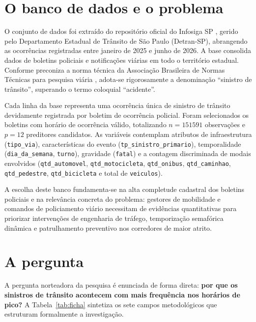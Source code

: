 \documentclass[
  article,
  12pt,
  oneside,
  a4paper,
  english,
  brazil
]{abntex2}\usepackage[]{graphicx}\usepackage[]{xcolor}
\begin{document}
\section{O banco de dados e o problema}

O conjunto de dados foi extraído do repositório oficial do Infosiga SP \cite{fonte_dados}, gerido pelo Departamento Estadual de Trânsito de São Paulo (Detran-SP), abrangendo as ocorrências registradas entre janeiro de 2025 e junho de 2026. A base consolida dados de boletins policiais e notificações viárias em todo o território estadual. Conforme preconiza a norma técnica da Associação Brasileira de Normas Técnicas para pesquisa viária \cite{abnt10697}, adota-se rigorosamente a denominação ``sinistro de trânsito'', superando o termo coloquial ``acidente''.

Cada linha da base representa uma ocorrência única de sinistro de trânsito devidamente registrada por boletim de ocorrência policial. Foram selecionados os boletins com horário de ocorrência válido, totalizando $n = \text{151591}$ observações e $p = \text{12}$ preditores candidatos. As variáveis contemplam atributos de infraestrutura (\texttt{tipo\_via}), características do evento (\texttt{tp\_sinistro\_primario}), temporalidade (\texttt{dia\_da\_semana}, \texttt{turno}), gravidade (\texttt{fatal}) e a contagem discriminada de modais envolvidos (\texttt{qtd\_automovel}, \texttt{qtd\_motocicleta}, \texttt{qtd\_onibus}, \texttt{qtd\_caminhao}, \texttt{qtd\_pedestre}, \texttt{qtd\_bicicleta} e total de \texttt{veiculos}).

A escolha deste banco fundamenta-se na alta completude cadastral dos boletins policiais e na relevância concreta do problema: gestores de mobilidade e comandos de policiamento viário necessitam de evidências quantitativas para priorizar intervenções de engenharia de tráfego, temporização semafórica dinâmica e patrulhamento preventivo nos corredores de maior atrito.

\section{A pergunta}

A pergunta norteadora da pesquisa é enunciada de forma direta: \textbf{por que os sinistros de trânsito acontecem com mais frequência nos horários de pico?} A Tabela~\ref{tab:ficha} sintetiza os sete campos metodológicos que estruturam formalmente a investigação.
\end{document}
